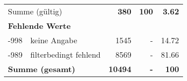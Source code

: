 \begin{longtable}{lXrrr}
     \midrule
     \multicolumn{2}{l}{Summe (gültig)} &
       \textbf{\num{380}} &
     \textbf{\num{100}} &
       \textbf{\num[round-mode=places,round-precision=2]{3.62}} \\
     \multicolumn{5}{l}{\textbf{Fehlende Werte}}\\
       -998 &
       keine Angabe &
         \num{1545} &
        - &
         \num[round-mode=places,round-precision=2]{14.72} \\
       -989 &
       filterbedingt fehlend &
         \num{8569} &
        - &
         \num[round-mode=places,round-precision=2]{81.66} \\
     \midrule
     \multicolumn{2}{l}{\textbf{Summe (gesamt)}} &
          \textbf{\num{10494}} &
        \textbf{-} &
        \textbf{\num{100}} \\
     \bottomrule
     \end{longtable}
     
